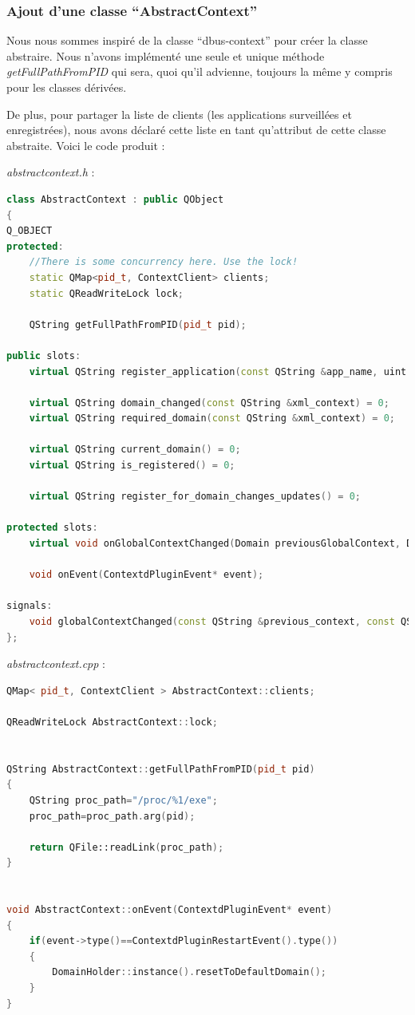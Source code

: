 \documentclass[pdftex,a4paper,titlepage,11pt]{article}
\begin{document}
\subsubsection{Ajout d'une classe ``AbstractContext''}

Nous nous sommes inspiré de la classe ``dbus-context'' pour créer la classe abstraire. Nous n'avons implémenté une seule et unique méthode \textit{getFullPathFromPID} qui sera, quoi qu'il advienne, toujours la même y compris pour les classes dérivées.

De plus, pour partager la liste de clients (les applications surveillées et enregistrées), nous avons déclaré cette liste en tant qu'attribut de cette classe abstraite. Voici le code produit :

\textit{abstractcontext.h} : 
\begin{lstlisting}[language=C++]
class AbstractContext : public QObject
{
Q_OBJECT
protected:
	//There is some concurrency here. Use the lock!
	static QMap<pid_t, ContextClient> clients;
	static QReadWriteLock lock;

	QString getFullPathFromPID(pid_t pid);

public slots:
	virtual QString register_application(const QString &app_name, uint app_pid) = 0;

	virtual QString domain_changed(const QString &xml_context) = 0;
	virtual QString required_domain(const QString &xml_context) = 0;

	virtual QString current_domain() = 0;
	virtual QString is_registered() = 0;

	virtual QString register_for_domain_changes_updates() = 0;

protected slots:
	virtual void onGlobalContextChanged(Domain previousGlobalContext, Domain globalContext) = 0;

	void onEvent(ContextdPluginEvent* event);

signals:
	void globalContextChanged(const QString &previous_context, const QString &new_context);
};
\end{lstlisting}

\textit{abstractcontext.cpp} : 
\begin{lstlisting}[language=C++]
QMap< pid_t, ContextClient > AbstractContext::clients;

QReadWriteLock AbstractContext::lock;


QString AbstractContext::getFullPathFromPID(pid_t pid)
{
	QString proc_path="/proc/%1/exe";
	proc_path=proc_path.arg(pid);

	return QFile::readLink(proc_path);
}


void AbstractContext::onEvent(ContextdPluginEvent* event)
{
	if(event->type()==ContextdPluginRestartEvent().type())
	{
		DomainHolder::instance().resetToDefaultDomain();
	}
}
\end{lstlisting}
\end{document}

